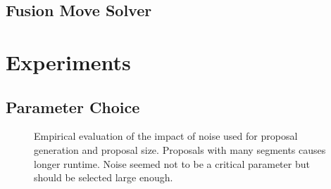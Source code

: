 \documentclass[10pt,twocolumn,letterpaper]{article}
\begin{document}
\subsection{Fusion Move Solver}


\section{Experiments}

\subsection{Parameter Choice}
\begin{figure}
\centering
{}
\caption{Empirical evaluation of the impact of noise used for proposal generation and proposal size.
  Proposals with many segments causes longer runtime. Noise seemed not to be a critical parameter but should be selected large enough.
}
\end{figure}
\end{document}
